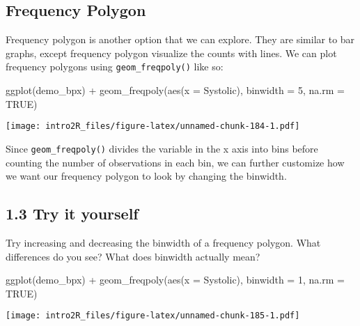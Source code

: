 \documentclass[
]{book}
\newenvironment{Shaded}{\begin{snugshade}}{\end{snugshade}}
\newcommand{\AttributeTok}[1]{\textcolor[rgb]{0.77,0.63,0.00}{#1}}
\newcommand{\ConstantTok}[1]{\textcolor[rgb]{0.00,0.00,0.00}{#1}}
\newcommand{\DecValTok}[1]{\textcolor[rgb]{0.00,0.00,0.81}{#1}}
\newcommand{\FunctionTok}[1]{\textcolor[rgb]{0.00,0.00,0.00}{#1}}
\newcommand{\NormalTok}[1]{#1}
\newcommand{\SpecialCharTok}[1]{\textcolor[rgb]{0.00,0.00,0.00}{#1}}
\begin{document}
\hypertarget{frequency-polygon}{%
\subsection{Frequency Polygon}\label{frequency-polygon}}

Frequency polygon is another option that we can explore. They are similar to bar graphs, except frequency polygon visualize the counts with lines. We can plot frequency polygons using \texttt{geom\_freqpoly()} like so:

\begin{Shaded}
\begin{Highlighting}[]
\FunctionTok{ggplot}\NormalTok{(demo\_bpx) }\SpecialCharTok{+}
    \FunctionTok{geom\_freqpoly}\NormalTok{(}\FunctionTok{aes}\NormalTok{(}\AttributeTok{x =}\NormalTok{ Systolic), }\AttributeTok{binwidth =} \DecValTok{5}\NormalTok{, }\AttributeTok{na.rm =} \ConstantTok{TRUE}\NormalTok{)}
\end{Highlighting}
\end{Shaded}

\texttt{[image: intro2R\_files/figure-latex/unnamed-chunk-184-1.pdf]}

Since \texttt{geom\_freqpoly()} divides the variable in the x axis into bins before counting the number of observations in each bin, we can further customize how we want our frequency polygon to look by changing the binwidth.

\hypertarget{try-it-yourself-25}{%
\subsection{1.3 Try it yourself}\label{try-it-yourself-25}}

Try increasing and decreasing the binwidth of a frequency polygon. What differences do you see? What does binwidth actually mean?

\begin{Shaded}
\begin{Highlighting}[]
\FunctionTok{ggplot}\NormalTok{(demo\_bpx) }\SpecialCharTok{+}
    \FunctionTok{geom\_freqpoly}\NormalTok{(}\FunctionTok{aes}\NormalTok{(}\AttributeTok{x =}\NormalTok{ Systolic), }\AttributeTok{binwidth =} \DecValTok{1}\NormalTok{, }\AttributeTok{na.rm =} \ConstantTok{TRUE}\NormalTok{)}
\end{Highlighting}
\end{Shaded}

\texttt{[image: intro2R\_files/figure-latex/unnamed-chunk-185-1.pdf]}
\end{document}
